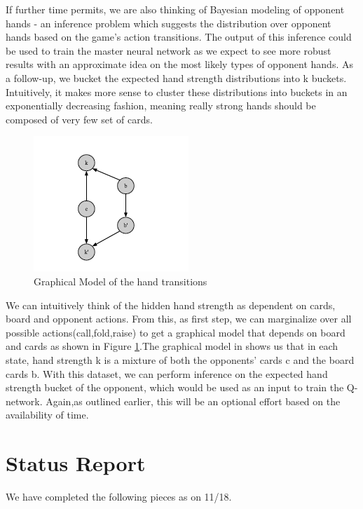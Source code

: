 \documentclass{article}
\begin{document}
If further time permits, we are also thinking of Bayesian modeling of opponent hands - an inference problem which suggests the distribution over opponent hands based on the game's action transitions. The output of this inference could be used to train the master neural network as we expect to see more robust results with an approximate idea on the most likely types of opponent hands. As a follow-up, we bucket the expected hand strength distributions into k buckets. Intuitively, it makes more sense to cluster these distributions into buckets in an exponentially decreasing fashion, meaning really strong hands should be composed of very few set of cards.\\
\begin{figure}
\includegraphics[scale=1]{Bayes_opp.png}
\caption{Graphical Model of the hand transitions}
\label{fig:fig1}
\end{figure}

We can intuitively think of the hidden hand strength as dependent on cards, board and opponent actions. From this, as first step, we can marginalize over all possible actions(call,fold,raise) to get a graphical model that depends on board and cards as shown in Figure \ref{fig:fig1}.The graphical model in shows us that in each state, hand strength k is a mixture of both the opponents' cards c and the board cards b.  With this dataset, we can perform inference on the expected hand strength bucket of the opponent, which would be used as an input to train the Q-network. Again,as outlined earlier, this will be an optional effort based on the availability of time.
\section{Status Report}
We have completed the following pieces as on 11/18.
\end{document}

